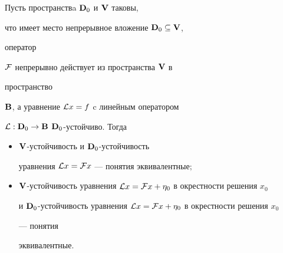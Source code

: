 \begin{lem}


Пусть пространствa $\bold {D}_0$ и $\bold {V}$ таковы,


что имеет место непрерывное вложение $\bold {D}_0\subseteq\bold {V}$,


оператор


$\cal F$ непрерывно действует из пространства $\bold {V}$ в


пространство


$\bold {B}$, а уравнение ${\cal L}x=f$ c линейным оператором


${\cal L}:\bold {D}_0\to\bold {B}$\; $\bold {D}_0$-устойчиво. Тогда


\begin{itemize}


\item[а)] $\bold {V}$-устойчивость и $\bold {D}_0$-устойчивость


уравнения ${\cal L}x={\cal F}x$ --- понятия эквивалентные$;$


\item[б)] $\spc{V}$-устойчивость уравнения ${\cal L}x={\cal


F}x+\eta_0$ в окрестности решения $x_0$


и $\spc{D}_0$-устойчивость уравнения ${\cal L}x={\cal


F}x+\eta_0$ в окрестности решения $x_0$


--- понятия


эквивалентные.


\end{itemize}


\end{lem}





